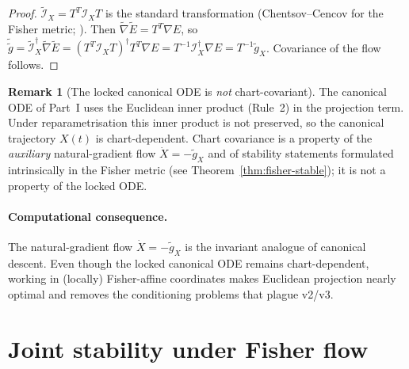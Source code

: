 \documentclass[11pt,oneside]{amsart}
\theoremstyle{plain}
\theoremstyle{definition}
\newtheorem{remark}[theorem]{Remark}
\newcommand{\gX}{g_X}
\begin{document}
\begin{proof}
$\widetilde{\mathcal{I}}_{X} = T^{T}\mathcal{I}_{X}T$ is the standard
transformation (Chentsov--Cencov for the Fisher metric;
\cite{amari2016}). Then
$\widetilde{\nabla}\widetilde E = T^{T}\nabla E$, so
$\widetilde{\widetilde g} = \widetilde{\mathcal{I}}_{X}^{\dagger}\widetilde\nabla\widetilde E
= (T^{T}\mathcal{I}_{X}T)^{\dagger}T^{T}\nabla E = T^{-1}\mathcal{I}_{X}^{\dagger}\nabla E
= T^{-1}\widetilde\gX$. Covariance of the flow follows.
\end{proof}

\begin{remark}[The locked canonical ODE is \emph{not} chart-covariant]
\label{rem:not-covariant}
The canonical ODE of Part~I uses the Euclidean inner product
(Rule~2) in the projection term. Under reparametrisation this inner
product is not preserved, so the canonical trajectory $X(t)$ is
chart-dependent. Chart covariance is a property of the
\emph{auxiliary} natural-gradient flow $\dot X = -\widetilde\gX$ and of
stability statements formulated intrinsically in the Fisher metric
(see Theorem~\ref{thm:fisher-stable}); it is not a property of the
locked ODE.
\end{remark}

\paragraph{Computational consequence.}
The natural-gradient flow $\dot X = -\widetilde\gX$ is the
invariant analogue of canonical descent. Even though the locked
canonical ODE remains chart-dependent, working in (locally)
Fisher-affine coordinates makes Euclidean projection nearly optimal
and removes the conditioning problems that plague v2/v3.

\section{Joint stability under Fisher flow}
\label{sec:fisher-stable}
\end{document}
